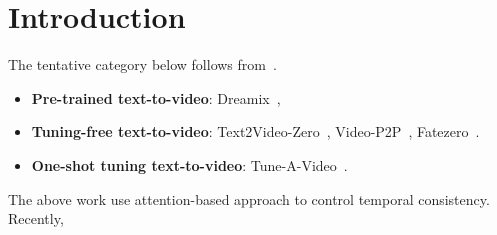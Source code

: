\section{Introduction}
The tentative category below follows from~\cite{wang2023gen}.
\begin{itemize}
    \item \textbf{Pre-trained text-to-video}: Dreamix~\citep{molad2023dreamix},
    \item \textbf{Tuning-free text-to-video}: Text2Video-Zero~\citep{khachatryan2023text2video}, Video-P2P~\citep{liu2023video}, Fatezero~\citep{qi2023fatezero}.
    \item \textbf{One-shot tuning text-to-video}: Tune-A-Video~\citep{wu2022tune}.
\end{itemize}

The above work use attention-based approach to control temporal consistency. Recently, 
